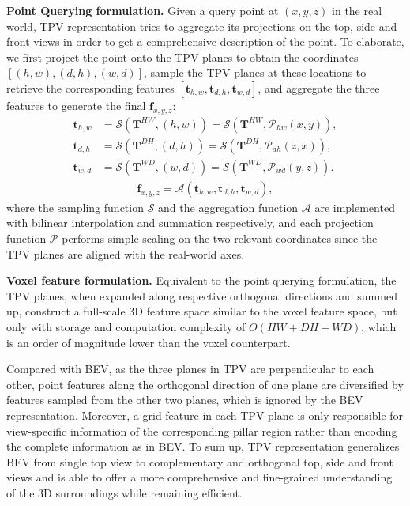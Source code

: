 \documentclass[10pt,twocolumn,letterpaper]{article}
\begin{document}
\textbf{Point Querying formulation.}
Given a query point at $(x,y,z)$ in the real world, TPV representation tries to aggregate its projections on the top, side and front views in order to get a comprehensive description of the point.
To elaborate, we first project the point onto the TPV planes to obtain the coordinates $[(h,w),(d,h),(w,d)]$, sample the TPV planes at these locations to retrieve the corresponding features $[\mathbf{t}_{h,w},\mathbf{t}_{d,h},\mathbf{t}_{w,d}]$, and aggregate the three features to generate the final $\mathbf{f}_{x,y,z}$:
\begin{equation}\label{eqn: tpv plane sampling}
    \begin{aligned}
        \mathbf{t}_{h,w} &= \mathcal{S}(\mathbf{T}^{HW},(h,w)) = \mathcal{S}(\mathbf{T}^{HW},\mathcal{P}_{hw}(x,y)), \\
        \mathbf{t}_{d,h} &= \mathcal{S}(\mathbf{T}^{DH},(d,h)) = \mathcal{S}(\mathbf{T}^{DH},\mathcal{P}_{dh}(z,x)), \\
        \mathbf{t}_{w,d} &= \mathcal{S}(\mathbf{T}^{WD},(w,d)) = \mathcal{S}(\mathbf{T}^{WD},\mathcal{P}_{wd}(y,z)).
    \end{aligned}
\end{equation}
\begin{equation}\label{eqn: tpv plane aggregate}
    \begin{aligned}
        \mathbf{f}_{x,y,z}=\mathcal{A}(\mathbf{t}_{h,w}, \mathbf{t}_{d,h}, \mathbf{t}_{w,d}),
    \end{aligned}
\end{equation}
where the sampling function $\mathcal{S}$ and the aggregation function $\mathcal{A}$ are implemented with bilinear interpolation and summation respectively, and each projection function $\mathcal{P}$ performs simple scaling on the two relevant coordinates since the TPV planes are aligned with the real-world axes.

\textbf{Voxel feature formulation.}
Equivalent to the point querying formulation, the TPV planes, when expanded along respective orthogonal directions and summed up, construct a full-scale 3D feature space similar to the voxel feature space, but only with storage and computation complexity of $O(HW+DH+WD)$, which is an order of magnitude lower than the voxel counterpart.

Compared with BEV, as the three planes in TPV are perpendicular to each other, point features along the orthogonal direction of one plane are diversified by features sampled from the other two planes, which is ignored by the BEV representation.
Moreover, a grid feature in each TPV plane is only responsible for view-specific information of the corresponding pillar region rather than encoding the complete information as in BEV.
To sum up, TPV representation generalizes BEV from single top view to complementary and orthogonal top, side and front views and is able to offer a more comprehensive and fine-grained understanding of the 3D surroundings while remaining efficient.
\end{document}
